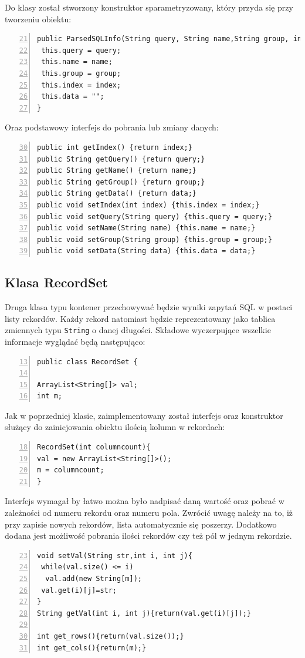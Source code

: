 Do klasy został stworzony konstruktor sparametryzowany, który przyda się przy tworzeniu obiektu:
   
\begin{lstlisting}[numbers=left,firstnumber=21]
public ParsedSQLInfo(String query, String name,String group, int index) {
 this.query = query;
 this.name = name;
 this.group = group;
 this.index = index;
 this.data = "";
}
\end{lstlisting}

Oraz podstawowy interfejs do  pobrania lub zmiany danych:
\begin{lstlisting}[numbers=left,firstnumber=30]
public int getIndex() {return index;}
public String getQuery() {return query;}
public String getName() {return name;}
public String getGroup() {return group;}
public String getData() {return data;}
public void setIndex(int index) {this.index = index;}
public void setQuery(String query) {this.query = query;}
public void setName(String name) {this.name = name;}
public void setGroup(String group) {this.group = group;}
public void setData(String data) {this.data = data;}
\end{lstlisting}

\subsection{Klasa RecordSet}
Druga klasa typu kontener przechowywać będzie wyniki zapytań SQL w postaci listy rekordów. Każdy rekord natomiast będzie reprezentowany jako tablica zmiennych typu \texttt{String} o danej długości. Składowe wyczerpujące wszelkie informacje wyglądać będą następująco:

\begin{lstlisting}[numbers=left,firstnumber=13]
public class RecordSet {

ArrayList<String[]> val;
int m;
\end{lstlisting}

Jak w poprzedniej klasie, zaimplementowany został interfejs oraz konstruktor służący do zainicjowania obiektu ilością kolumn w rekordach:
 \begin{lstlisting}[numbers=left,firstnumber=18]
RecordSet(int columncount){
val = new ArrayList<String[]>();
m = columncount;
}
 \end{lstlisting}

Interfejs wymagał by łatwo można było nadpisać daną wartość oraz pobrać w zależności od numeru rekordu oraz numeru pola. Zwrócić uwagę należy na to, iż przy zapisie nowych rekordów, lista automatycznie się poszerzy. Dodatkowo dodana jest możliwość pobrania ilości rekordów czy też pól w jednym rekordzie.
 \begin{lstlisting}[numbers=left,firstnumber=23]
void setVal(String str,int i, int j){
 while(val.size() <= i)
  val.add(new String[m]);
 val.get(i)[j]=str;
}
String getVal(int i, int j){return(val.get(i)[j]);}   

int get_rows(){return(val.size());}
int get_cols(){return(m);}
\end{lstlisting}

